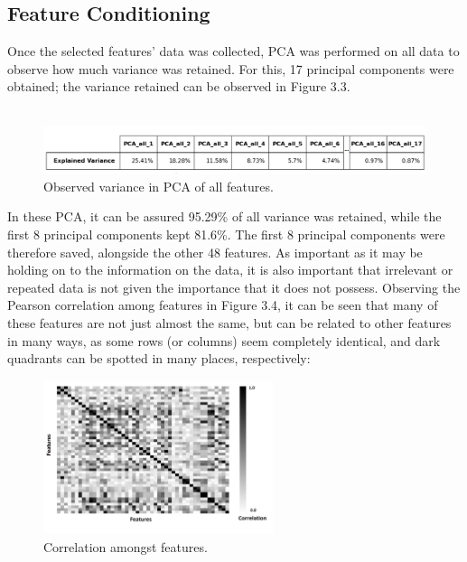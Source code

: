 \subsection{Feature Conditioning}
Once the selected features' data was collected, PCA was performed on all data to observe how much variance was retained. For this, 17 principal components were obtained; the variance retained can be observed in Figure 3.3.\\\\   

\begin{figure}[h]
    \centering
    \includegraphics[width=\textwidth]{Images/Results/Feature Analysis/PCA_all variance.png}
    \caption{Observed variance in PCA of all features.}
\end{figure}
In these PCA, it can be assured 95.29\% of all variance was retained, while the first 8 principal components kept 81.6\%. The first 8 principal components were therefore saved, alongside the other 48 features.
As important as it may be holding on to the information on the data, it is also important that irrelevant or repeated data is not given the importance that it does not possess. 
Observing the Pearson correlation among features in Figure 3.4, it can be seen that many of these features are not just almost the same, but can be related to other features in many ways, as some rows (or columns) seem completely identical, and dark quadrants can be spotted in many places, respectively:
\begin{figure}[h]
    \centering
    \includegraphics[width=0.6\textwidth]{Images/Results/Feature Analysis/feature correlation.png}
    \caption{Correlation amongst features.}
\end{figure}
